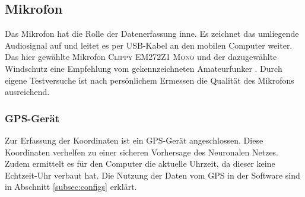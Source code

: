 \subsection{Mikrofon}
\label{subsec:mikrofon}

Das Mikrofon hat die Rolle der Datenerfassung inne. Es zeichnet das umliegende Audiosignal auf und leitet es per USB-Kabel an den mobilen Computer weiter. 
Das hier gewählte Mikrofon \textsc{Clippy EM272Z1 Mono} \cite{clippy_microphone} und der dazugewählte Windschutz \cite{soundscapes_windshield} eine Empfehlung vom gekennzeichneten
Amateurfunker \cite{amateurfunker}.
Durch eigene Testversuche ist nach persönlichem Ermessen die Qualität des Mikrofons ausreichend.



\subsubsection{GPS-Gerät}
\label{subsec:gps}
Zur Erfassung der Koordinaten ist ein GPS-Gerät angeschlossen. Diese Koordinaten verhelfen zu einer sicheren Vorhersage des Neuronalen Netzes. Zudem ermittelt es für den Computer die aktuelle Uhrzeit, da dieser %
keine Echtzeit-Uhr verbaut hat. Die Nutzung der Daten vom GPS in der Software sind in Abschnitt \ref{subsec:configs} erklärt.
